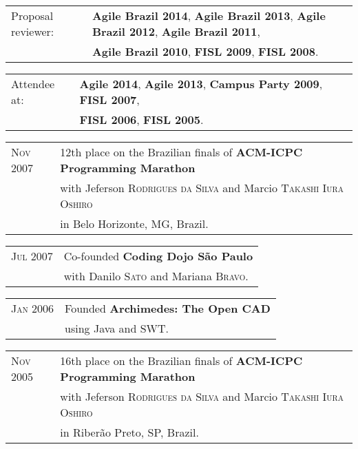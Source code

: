\documentclass[letter,10pt]{article}
\begin{document}
\begin{tabular}{p{2.5cm}l}
  Proposal reviewer: & \textbf{Agile Brazil 2014}, \textbf{Agile Brazil 2013}, \textbf{Agile Brazil 2012}, \textbf{Agile Brazil 2011},\\
  & \textbf{Agile Brazil 2010}, \textbf{FISL 2009}, \textbf{FISL 2008}.
\end{tabular}

\begin{tabular}{p{2.5cm}l}
  Attendee at: & \textbf{Agile 2014}, \textbf{Agile 2013}, \textbf{Campus Party 2009}, \textbf{FISL 2007},\\
  & \textbf{FISL 2006}, \textbf{FISL 2005}.
\end{tabular}

\begin{tabular}{p{2.5cm}l}
  \textsc{Nov 2007} & 12th place on the Brazilian finals of \textbf{ACM-ICPC
    Programming Marathon}\\
  & with Jeferson \textsc{Rodrigues da Silva} and Marcio
  \textsc{Takashi Iura Oshiro}\\
  & in Belo Horizonte, MG, Brazil.\\
\end{tabular}

\begin{tabular}{p{2.5cm}l}
  \textsc{Jul 2007} & Co-founded \textbf{Coding Dojo São Paulo}\\
  & with Danilo \textsc{Sato} and Mariana \textsc{Bravo}.\\
\end{tabular}

\begin{tabular}{p{2.5cm}l}
  \textsc{Jan 2006} & Founded \textbf{Archimedes: The Open CAD}\\
  & using Java and SWT.\\
\end{tabular}

\begin{tabular}{p{2.5cm}l}
  \textsc{Nov 2005} & 16th place on the Brazilian finals of \textbf{ACM-ICPC
    Programming Marathon}\\
  & with Jeferson \textsc{Rodrigues da Silva} and Marcio
  \textsc{Takashi Iura Oshiro}\\
  & in Riberão Preto, SP, Brazil.\\
\end{tabular}
\end{document}
